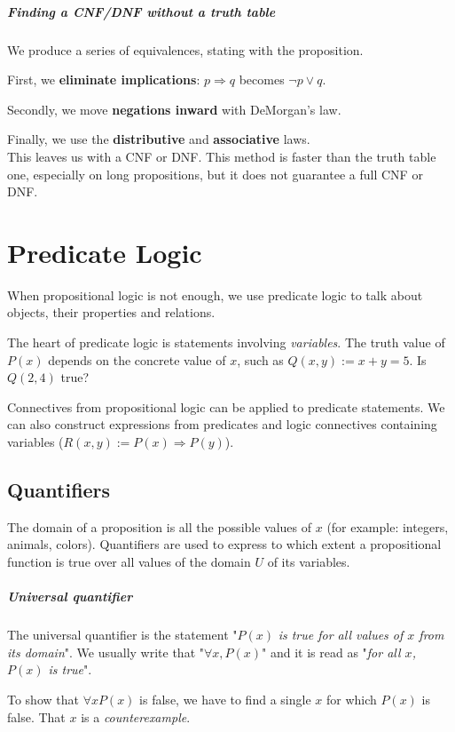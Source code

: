 \documentclass[10pt,a4paper]{book}
\begin{document}
\paragraph*{Finding a CNF/DNF without a truth table}
We produce a series of equivalences, stating with the proposition. \par 
First, we \textbf{eliminate implications}: $p\Rightarrow q$ becomes $\neg p\lor q$. \par 
Secondly, we move \textbf{negations inward} with DeMorgan's law.\par 
Finally, we use the \textbf{distributive} and \textbf{associative} laws.\\
This leaves us with a CNF or DNF. This method is faster than the truth table one, especially on long propositions, but it does not guarantee a full CNF or DNF.

\chapter{Predicate Logic}

When propositional logic is not enough, we use predicate logic to talk about objects, their properties and relations.\par 
The heart of predicate logic is statements involving \textit{variables}. The truth value of $P(x)$ depends on the concrete value of $x$, such as $Q(x,y):=x+y=5$. Is $Q(2,4)$ true?\par 
Connectives from propositional logic can be applied to predicate statements. We can also construct expressions from predicates and logic connectives containing variables ($R(x,y):=P(x)\Rightarrow P(y)$).

\section{Quantifiers}
The domain of a proposition is all the possible values of $x$ (for example: integers, animals, colors).
Quantifiers are used to express to which extent a propositional function is true over all values of the domain $U$ of its variables. 
\paragraph*{Universal quantifier}
The universal quantifier is the statement "$P(x)$ \textit{is true for all values of $x$ from its domain}". We usually write that "$\forall x, P(x)$" and it is read as "\textit{for all $x$, $P(x)$ is true}".\par 
To show that $\forall xP(x)$ is false, we have to find a single $x$ for which $P(x)$ is false. That $x$ is a \textit{counterexample}.
\end{document}
